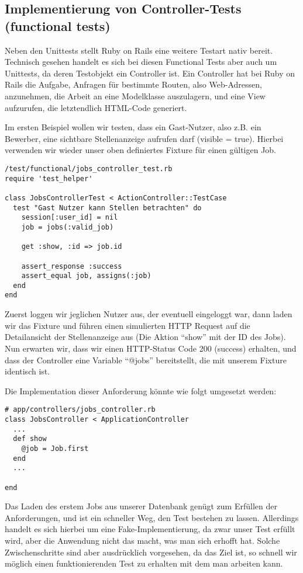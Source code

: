 \subsection{Implementierung von Controller-Tests (functional tests)}

Neben den Unittests stellt Ruby on Rails eine weitere Testart nativ bereit. Technisch gesehen handelt es sich bei diesen Functional Tests aber auch um Unittests, da deren Testobjekt ein Controller ist. 
Ein Controller hat bei Ruby on Rails die Aufgabe, Anfragen für bestimmte Routen, also Web-Adressen, anzunehmen, die Arbeit an eine Modelklasse auszulagern, und eine View aufzurufen, die letztendlich HTML-Code generiert.

Im ersten Beispiel wollen wir testen, dass ein Gast-Nutzer, also z.B. ein Bewerber, eine sichtbare Stellenanzeige aufrufen darf (visible = true). Hierbei verwenden wir wieder unser oben definiertes Fixture für einen gültigen Job.
\begin{lstlisting}
/test/functional/jobs_controller_test.rb 
require 'test_helper'

class JobsControllerTest < ActionController::TestCase
  test "Gast Nutzer kann Stellen betrachten" do
    session[:user_id] = nil
    job = jobs(:valid_job)
    
    get :show, :id => job.id
    
    assert_response :success
    assert_equal job, assigns(:job)
  end
end
\end{lstlisting}
\tddred
Zuerst loggen wir jeglichen Nutzer aus, der eventuell eingeloggt war, dann laden wir das Fixture und führen einen simulierten HTTP Request auf die Detailansicht der Stellenanzeige aus (Die Aktion "`show"' mit der ID des Jobs).
Nun erwarten wir, dass wir einen HTTP-Status Code 200 (success) erhalten, und dass der Controller eine Variable "`@jobs"' bereitstellt, die mit unserem Fixture identisch ist.

Die Implementation dieser Anforderung könnte wie folgt umgesetzt werden:
\begin{lstlisting}
# app/controllers/jobs_controller.rb
class JobsController < ApplicationController
  ...
  def show
    @job = Job.first
  end
  ...
  
end
\end{lstlisting}
\tddgreen
Das Laden des erstem Jobs aus unserer Datenbank genügt zum Erfüllen der Anforderungen, und ist ein schneller Weg, den Test bestehen zu lassen. Allerdings handelt es sich hierbei um eine Fake-Implementierung, da zwar unser Test erfüllt wird, aber die Anwendung nicht das macht, was man sich erhofft hat. Solche Zwischenschritte sind aber ausdrücklich vorgesehen, da das Ziel ist, so schnell wir möglich einen funktionierenden Test zu erhalten mit dem man arbeiten kann.

